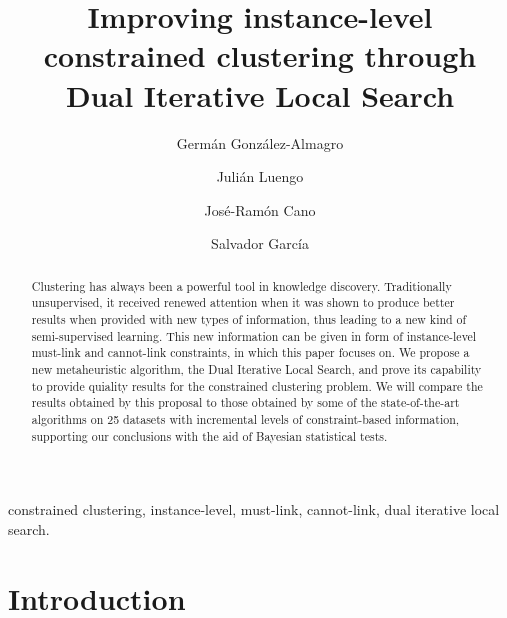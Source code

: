 \documentclass[review]{elsarticle}
\begin{document}
\begin{frontmatter}

\title{Improving instance-level constrained clustering through Dual Iterative Local Search}

\author[mymainaddress]{Germ\'an Gonz\'alez-Almagro}

\author[mymainaddress]{Juli\'an Luengo}

\author[mysecondaddress]{Jos\'e-Ram\'on Cano}

\author[mymainaddress]{Salvador Garc\'ia}

\address[mymainaddress]{DaSCI Andalusian Institute of Data Science and Computational Intelligence, University of Granada, Spain}

\address[mysecondaddress]{Dept. of Computer Science, EPS of Linares, University of Ja\'en, Campus Cient\'ifico Tecnol\'ogico de Linares, Cintur\'on Sur S/N, Linares 23700, Ja\'en, Spain}

\begin{abstract}
Clustering has always been a powerful tool in knowledge discovery. Traditionally unsupervised, it received renewed attention when it was shown to produce better results when provided with new types of information, thus leading to a new kind of semi-supervised learning. This new information can be given in form of instance-level must-link and cannot-link constraints, in which this paper focuses on. We propose a new metaheuristic algorithm, the Dual Iterative Local Search, and prove its capability to provide quiality results for the constrained clustering problem. We will compare the results obtained by this proposal to those obtained by some of the state-of-the-art algorithms on 25 datasets with incremental levels of constraint-based information, supporting our conclusions with the aid of Bayesian statistical tests.
\end{abstract}

\begin{keyword}
constrained clustering, instance-level, must-link, cannot-link, dual iterative local search.
\end{keyword}

\end{frontmatter}

\linenumbers

\section{Introduction} \label{sec:Intro}
\end{document}
